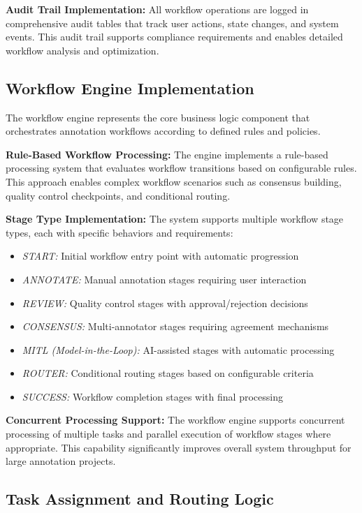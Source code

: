 \textbf{Audit Trail Implementation:} All workflow operations are logged in comprehensive audit tables that track user actions, state changes, and system events. This audit trail supports compliance requirements and enables detailed workflow analysis and optimization.

\subsection{Workflow Engine Implementation}

The workflow engine represents the core business logic component that orchestrates annotation workflows according to defined rules and policies.

\textbf{Rule-Based Workflow Processing:} The engine implements a rule-based processing system that evaluates workflow transitions based on configurable rules. This approach enables complex workflow scenarios such as consensus building, quality control checkpoints, and conditional routing.

\textbf{Stage Type Implementation:} The system supports multiple workflow stage types, each with specific behaviors and requirements:

\begin{itemize}
    \item \textit{START:} Initial workflow entry point with automatic progression
    \item \textit{ANNOTATE:} Manual annotation stages requiring user interaction
    \item \textit{REVIEW:} Quality control stages with approval/rejection decisions
    \item \textit{CONSENSUS:} Multi-annotator stages requiring agreement mechanisms
    \item \textit{MITL (Model-in-the-Loop):} AI-assisted stages with automatic processing
    \item \textit{ROUTER:} Conditional routing stages based on configurable criteria
    \item \textit{SUCCESS:} Workflow completion stages with final processing
\end{itemize}

\textbf{Concurrent Processing Support:} The workflow engine supports concurrent processing of multiple tasks and parallel execution of workflow stages where appropriate. This capability significantly improves overall system throughput for large annotation projects.

\subsection{Task Assignment and Routing Logic}

